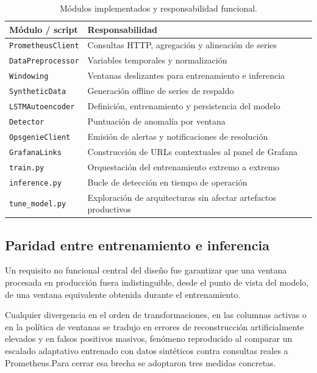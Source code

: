\begin{table}[h]
\centering
\footnotesize
\caption{Módulos implementados y responsabilidad funcional.}
\label{tab:modulos}
\begin{tabular}{@{}>{\raggedright\arraybackslash}p{}>{\raggedright\arraybackslash}p{}@{}}
\toprule
\textbf{Módulo / script} & \textbf{Responsabilidad} \\
\midrule
\texttt{PrometheusClient} & Consultas HTTP, agregación y alineación de series \\
\texttt{DataPreprocessor} & Variables temporales y normalización \\
\texttt{Windowing} & Ventanas deslizantes para entrenamiento e inferencia \\
\texttt{SyntheticData} & Generación offline de series de respaldo \\
\texttt{LSTMAutoencoder} & Definición, entrenamiento y persistencia del modelo \\
\texttt{Detector} & Puntuación de anomalía por ventana \\
\texttt{OpsgenieClient} & Emisión de alertas y notificaciones de resolución \\
\texttt{GrafanaLinks} & Construcción de URLs contextuales al panel de Grafana \\
\texttt{train.py} & Orquestación del entrenamiento extremo a extremo \\
\texttt{inference.py} & Bucle de detección en tiempo de operación \\
\texttt{tune\_model.py} & Exploración de arquitecturas sin afectar artefactos productivos \\
\bottomrule
\end{tabular}
\end{table}

\subsection{Paridad entre entrenamiento e inferencia}

Un requisito no funcional central del diseño fue garantizar que una ventana procesada en producción fuera indistinguible, desde el punto de vista del modelo, de una ventana equivalente obtenida durante el entrenamiento.

Cualquier divergencia en el orden de transformaciones, en las columnas activas o en la política de ventanas se tradujo en errores de reconstrucción artificialmente elevados y en falsos positivos masivos, fenómeno reproducido al comparar un escalado adaptativo entrenado con datos sintéticos contra consultas reales a Prometheus.Para cerrar esa brecha se adoptaron tres medidas concretas.

